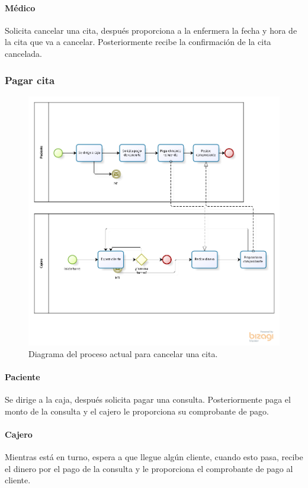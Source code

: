 	\paragraph{Médico}
	Solicita cancelar una cita, después proporciona a la enfermera la fecha y hora de la cita que va a cancelar. Posteriormente recibe la confirmación de la cita cancelada.
	
\subsubsection{Pagar cita}
	\begin{figure}[htbp!]
		\centering
		\includegraphics[width=\textwidth]{images/procesos/pago_consulta_old}
		\caption{Diagrama del proceso actual para cancelar una cita.}
	\end{figure}
	\paragraph{Paciente}
	Se dirige a la caja, después solicita pagar una consulta. Posteriormente paga el monto de la consulta y el cajero le proporciona su comprobante de pago.
	\paragraph{Cajero}
	Mientras está en turno, espera a que llegue algún cliente, cuando esto pasa, recibe el dinero por el pago de la consulta y le proporciona el comprobante de pago al cliente.
